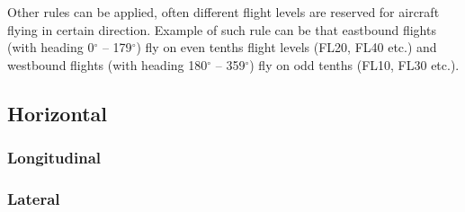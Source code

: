 Other rules can be applied, often different flight levels are reserved for aircraft flying in certain direction. Example of such rule can be that eastbound flights (with heading 0$^{\circ}$ – 179$^{\circ}$) fly on even tenths flight levels (FL20, FL40 etc.) and westbound flights (with heading 180$^{\circ}$ – 359$^{\circ}$) fly on odd tenths (FL10, FL30 etc.).


\subsection{Horizontal}
\subsubsection{Longitudinal}
\subsubsection{Lateral}









